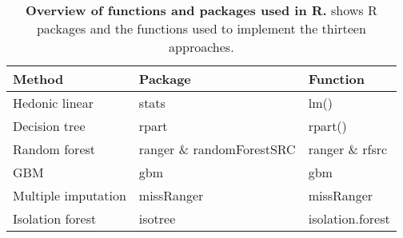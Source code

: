 \begin{table}[ht]
\centering
\caption{{\bf Overview of functions and packages used in \textsf{R}.} shows \textsf{R} packages and the functions used to implement the thirteen approaches. \setlength{\baselineskip}{1.25em}}
\label{tab_summary_r_packages}
\begin{threeparttable}
\begin{tabular}{lll}
\toprule\toprule
Method              &Package                                       &Function\\
\hline
Hedonic linear      &\textsf{stats}                                &\textsf{lm()}\\
Decision tree       &\textsf{rpart}                                &\textsf{rpart()}\\
Random forest       &\textsf{ranger} \& \textsf{randomForestSRC}   &\textsf{ranger} \& \textsf{rfsrc}\\
GBM                 &\textsf{gbm}                                  &\textsf{gbm}\\
Multiple imputation &\textsf{missRanger}                           &\textsf{missRanger}\\
Isolation forest    &\textsf{isotree}                              &\textsf{isolation.forest}\\
\bottomrule\bottomrule
\end{tabular}
\end{threeparttable}
\end{table}